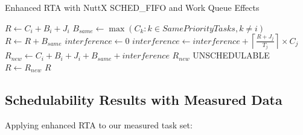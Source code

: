 \documentclass[12pt,a4paper]{article}
\begin{document}
\begin{algorithm}[H]
\caption{Enhanced RTA with NuttX SCHED\_FIFO and Work Queue Effects}
\begin{algorithmic}[1]
    \State $R \gets C_i + B_i + J_i$
    \State $B_{same} \gets \max(C_k : k \in SamePriorityTasks, k \neq i)$ 
    \State $R \gets R + B_{same}$
        \State $interference \gets 0$
            \State $interference \gets interference + \left\lceil \frac{R + J_j}{T_j} \right\rceil \times C_j$
        \EndFor
        \State $R_{new} \gets C_i + B_i + J_i + B_{same} + interference$
            \State \Return $R_{new}$ 
        \EndIf
            \State \Return UNSCHEDULABLE
        \EndIf
        \State $R \gets R_{new}$
    \EndFor
    \State \Return $R$ 
\EndFunction
\end{algorithmic}
\end{algorithm}

\subsection{Schedulability Results with Measured Data}

Applying enhanced RTA to our measured task set:
\end{document}
